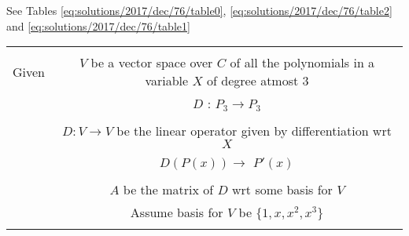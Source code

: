 See Tables \ref{eq:solutions/2017/dec/76/table0}, \ref{eq:solutions/2017/dec/76/table2} and \ref{eq:solutions/2017/dec/76/table1}


\begin{table*}[ht!]
\begin{center}
\begin{tabular}{|c|c|}
\hline
& \\
Given & $V$ be a vector space over $C$ of all the polynomials in a variable $X$ of degree atmost 3\\
& $D$ : $P_3 \xrightarrow{} P_3$ \\ 
& \\
& $D:V\xrightarrow{}V$ be the linear operator given by differentiation wrt $X$\\
& $D(P(x)) \xrightarrow{}$ $P'(x)$ \\
& \\
& $A$ be the matrix of $D$ wrt some basis for $V$ \\
& Assume basis for $V$ be $\{1,x,x^2,x^3\}$ \\
& \\
\hline
\end{tabular}
\end{center}
\caption{}
\label{eq:solutions/2017/dec/76/table0}
\end{table*}
